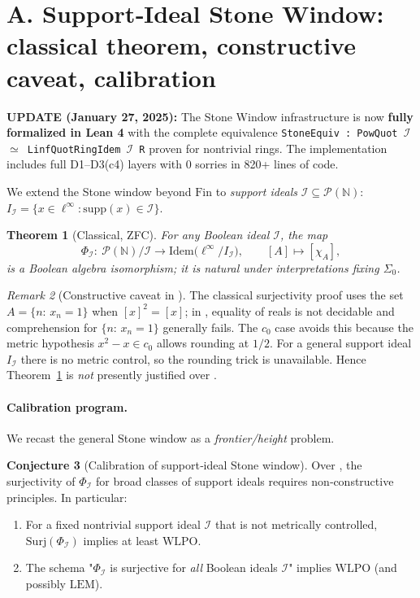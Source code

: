 \documentclass[11pt]{article}
\newtheorem{theorem}{Theorem}[section]
\theoremstyle{definition}
\newtheorem{conjecture}[theorem]{Conjecture}
\theoremstyle{remark}
\newtheorem{remark}[theorem]{Remark}
\newcommand{\linf}{\ell^\infty}
\newcommand{\WLPO}{\mathrm{WLPO}}
\newcommand{\LEM}{\mathrm{LEM}}
\newcommand{\BISH}{\mathrm{BISH}}
\newcommand{\SigmaZero}{\Sigma_{0}}
\begin{document}
\section{A. Support‑Ideal Stone Window: classical theorem, constructive caveat, calibration}

\textbf{UPDATE (January 27, 2025):} The Stone Window infrastructure is now \textbf{fully formalized in Lean 4} with the complete equivalence \texttt{StoneEquiv : PowQuot $\mathcal{I}$ $\simeq$ LinfQuotRingIdem $\mathcal{I}$ R} proven for nontrivial rings. The implementation includes full D1--D3(c4) layers with 0 sorries in 820+ lines of code.

We extend the Stone window beyond $\mathrm{Fin}$ to \emph{support ideals} $\mathcal I\subseteq\mathcal P(\mathbb N)$:
$I_{\mathcal I}=\{x\in\linf:\mathrm{supp}(x)\in\mathcal I\}$.

\begin{theorem}[Classical, ZFC]\label{VI:thm:stone-general-classical}
For any Boolean ideal $\mathcal I$, the map
\[
\Phi_{\mathcal I}: \ \mathcal P(\mathbb N)/\mathcal I \longrightarrow \mathrm{Idem}\big(\linf/I_{\mathcal I}\big),\qquad [A]\mapsto [\chi_A],
\]
is a Boolean algebra isomorphism; it is natural under interpretations fixing $\SigmaZero$.
\end{theorem}

\begin{remark}[Constructive caveat in \BISH]\label{VI:rem:constructive-caveat}
The classical surjectivity proof uses the set $A=\{n:\, x_n=1\}$ when $[x]^2=[x]$; in \BISH, equality of reals is not decidable and comprehension for $\{n:\,x_n=1\}$ generally fails. The $c_0$ case avoids this because the metric hypothesis $x^2-x\in c_0$ allows rounding at $1/2$. For a general support ideal $I_{\mathcal I}$ there is no metric control, so the rounding trick is unavailable. Hence Theorem~\ref{VI:thm:stone-general-classical} is \emph{not} presently justified over \BISH.
\end{remark}

\paragraph{Calibration program.}
We recast the general Stone window as a \emph{frontier/height} problem.

\begin{conjecture}[Calibration of support‑ideal Stone window]\label{VI:conj:stone-calibration}
Over \BISH, the surjectivity of $\Phi_{\mathcal I}$ for broad classes of support ideals requires non‑constructive principles. In particular:
\begin{enumerate}
\item For a fixed nontrivial support ideal $\mathcal I$ that is not metrically controlled, \(\mathrm{Surj}(\Phi_{\mathcal I})\) implies at least \(\WLPO\).
\item The schema "$\Phi_{\mathcal I}$ is surjective for \emph{all} Boolean ideals $\mathcal I$" implies \(\WLPO\) (and possibly \(\LEM\)).
\end{enumerate}
\end{conjecture}
\end{document}
